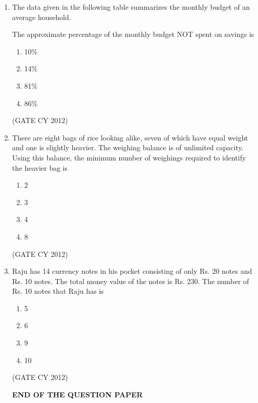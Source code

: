 \documentclass[12pt]{article}
\begin{document}
\begin{enumerate}
    \item The data given in the following table summarizes the monthly budget of an average household.

    
    \captionsetup{type=table}

    

    The approximate percentage of the monthly budget NOT spent on savings is
    \begin{multicols}{2}
        \begin{enumerate}[label=(\Alph*)]
            \item 10\%
            \item 14\%
            \item 81\%
            \item 86\%
        \end{enumerate}
    \end{multicols}
    \hfill (GATE CY 2012)

    \item There are eight bags of rice looking alike, seven of which have equal weight and one is slightly heavier. The weighing balance is of unlimited capacity. Using this balance, the minimum number of weighings required to identify the heavier bag is
    \begin{multicols}{2}
        \begin{enumerate}[label=(\Alph*)]
            \item 2
            \item 3
            \item 4
            \item 8
        \end{enumerate}
    \end{multicols}
    \hfill (GATE CY 2012)

    \item Raju has 14 currency notes in his pocket consisting of only Rs. 20 notes and Rs. 10 notes. The total money value of the notes is Rs. 230. The number of Rs. 10 notes that Raju has is
    \begin{multicols}{2}
        \begin{enumerate}[label=(\Alph*)]
            \item 5
            \item 6
            \item 9
            \item 10
        \end{enumerate}
    \end{multicols}
    \hfill (GATE CY 2012)


\begin{center}
\textbf{END OF THE QUESTION PAPER}
\end{center}



\end{enumerate}
\end{document}
